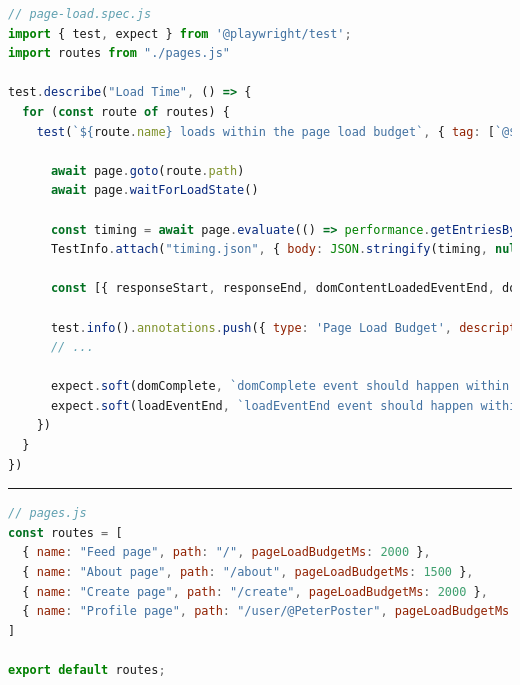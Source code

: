 \documentclass[a4paper, 12pt]{article}
\begin{document}
\vspace{1cm}
\begin{lstlisting}[caption={Test file for page load times}, label={lst:page-load-spec}, language=JavaScript]
// page-load.spec.js
import { test, expect } from '@playwright/test';
import routes from "./pages.js"

test.describe("Load Time", () => {
  for (const route of routes) {
    test(`${route.name} loads within the page load budget`, { tag: [`@${route.name}`, '@pageLoad'] }, async ({ page }, TestInfo) => {

      await page.goto(route.path)
      await page.waitForLoadState()

      const timing = await page.evaluate(() => performance.getEntriesByType('navigation'));
      TestInfo.attach("timing.json", { body: JSON.stringify(timing, null, 2), contentType: "application/json" })

      const [{ responseStart, responseEnd, domContentLoadedEventEnd, domComplete, loadEventEnd }] = timing;

      test.info().annotations.push({ type: 'Page Load Budget', description: `The time budget for this page was ${route.pageLoadBudgetMs}ms` });
      // ...

      expect.soft(domComplete, `domComplete event should happen within ${route.pageLoadBudgetMs} ms`).toBeLessThanOrEqual(route.pageLoadBudgetMs)
      expect.soft(loadEventEnd, `loadEventEnd event should happen within ${route.pageLoadBudgetMs} ms`).toBeLessThanOrEqual(route.pageLoadBudgetMs)
    })
  }
})
\end{lstlisting}
\hrule
\begin{lstlisting}[caption={Test pages configuration}, label={lst:pages-config}, language=JavaScript]
// pages.js
const routes = [
  { name: "Feed page", path: "/", pageLoadBudgetMs: 2000 },
  { name: "About page", path: "/about", pageLoadBudgetMs: 1500 },
  { name: "Create page", path: "/create", pageLoadBudgetMs: 2000 },
  { name: "Profile page", path: "/user/@PeterPoster", pageLoadBudgetMs: 2000 },
]

export default routes;
\end{lstlisting}
\pagebreak
\end{document}
